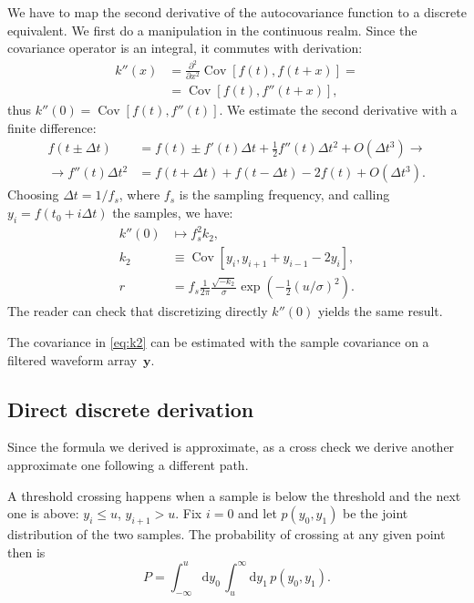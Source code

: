 We have to map the second derivative of the autocovariance function to a
discrete equivalent. We first do a manipulation in the continuous realm. Since
the covariance operator is an integral, it commutes with derivation:
%
\begin{align}
    k''(x)
    &= \frac{\partial^2}{\partial x^2} \operatorname{Cov}[f(t), f(t+x)] = \\
    &= \operatorname{Cov}[f(t), f''(t+x)],
\end{align}
%
thus $k''(0) = \operatorname{Cov}[f(t), f''(t)]$. We estimate the second
derivative with a finite difference:
%
\begin{align}
    f(t \pm \Delta t)
    &= f(t) \pm f'(t) \Delta t + \frac12 f''(t) \Delta t^2 + O(\Delta t^3)
    \rightarrow \\
    \rightarrow f''(t) \Delta t^2 &=
    f(t + \Delta t) + f(t - \Delta t) - 2 f(t) + O(\Delta t^3).
\end{align}
%
Choosing $\Delta t = 1/f_s$, where $f_s$ is the sampling frequency, and calling
$y_i = f(t_0 + i\Delta t)$ the samples, we have:
\begin{align}
    k''(0) &\mapsto f_s^2 k_2, \\
    k_2 &\equiv \operatorname{Cov}[y_i, y_{i+1}+y_{i-1}-2y_i], \label{eq:k2} \\
    r &= f_s \frac 1 {2\pi} \frac {\sqrt{-k_2}} \sigma
         \exp \left( -\frac12 (u/\sigma)^2 \right).
    \label{eq:rcont}
\end{align}
%
The reader can check that discretizing directly $k''(0)$ yields the same result.

The covariance in \autoref{eq:k2} can be estimated with the sample
covariance on a filtered waveform array~$\mathbf y$.

\subsection{Direct discrete derivation}

Since the formula we derived is approximate, as a cross check we derive another
approximate one following a different path.

A threshold crossing happens when a sample is below the threshold and the next
one is above: $y_i \leq u$, $y_{i+1} > u$. Fix $i=0$ and let $p(y_0,y_1)$ be the
joint distribution of the two samples. The probability of crossing at any given
point then is
%
\begin{equation}
    P =
    \int_{-\infty}^u \mathrm d y_0\,
    \int_u^\infty \mathrm d y_1\,
    p(y_0, y_1).
    \label{eq:crossingprob}
\end{equation}

